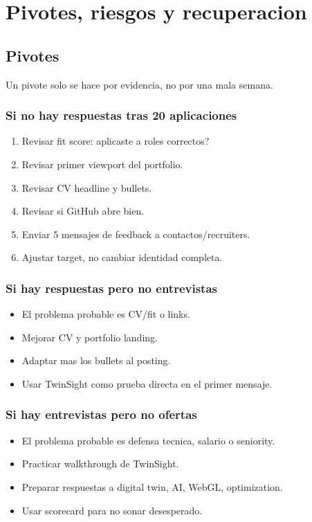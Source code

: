 \chapter{Pivotes, riesgos y recuperacion}

\section{Pivotes}


Un pivote solo se hace por evidencia, no por una mala semana.


\subsection{Si no hay respuestas tras 20 aplicaciones}


\begin{enumerate}
\item Revisar fit score: aplicaste a roles correctos?
\item Revisar primer viewport del portfolio.
\item Revisar CV headline y bullets.
\item Revisar si GitHub abre bien.
\item Enviar 5 mensajes de feedback a contactos/recruiters.
\item Ajustar target, no cambiar identidad completa.
\end{enumerate}


\subsection{Si hay respuestas pero no entrevistas}


\begin{itemize}
\item El problema probable es CV/fit o links.
\item Mejorar CV y portfolio landing.
\item Adaptar mas los bullets al posting.
\item Usar TwinSight como prueba directa en el primer mensaje.
\end{itemize}


\subsection{Si hay entrevistas pero no ofertas}


\begin{itemize}
\item El problema probable es defensa tecnica, salario o seniority.
\item Practicar walkthrough de TwinSight.
\item Preparar respuestas a digital twin, AI, WebGL, optimization.
\item Usar scorecard para no sonar desesperado.
\end{itemize}


